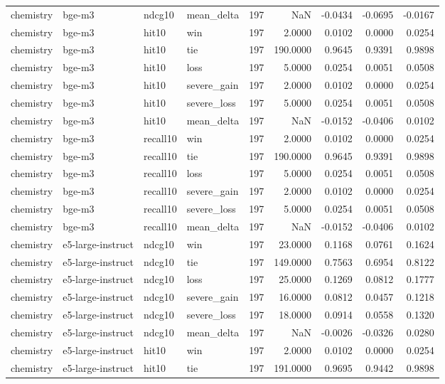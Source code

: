 \begin{tabular}{llllrrrrr}
chemistry & bge-m3 & ndcg10 & mean\_delta & 197 & NaN & -0.0434 & -0.0695 & -0.0167 \\
chemistry & bge-m3 & hit10 & win & 197 & 2.0000 & 0.0102 & 0.0000 & 0.0254 \\
chemistry & bge-m3 & hit10 & tie & 197 & 190.0000 & 0.9645 & 0.9391 & 0.9898 \\
chemistry & bge-m3 & hit10 & loss & 197 & 5.0000 & 0.0254 & 0.0051 & 0.0508 \\
chemistry & bge-m3 & hit10 & severe\_gain & 197 & 2.0000 & 0.0102 & 0.0000 & 0.0254 \\
chemistry & bge-m3 & hit10 & severe\_loss & 197 & 5.0000 & 0.0254 & 0.0051 & 0.0508 \\
chemistry & bge-m3 & hit10 & mean\_delta & 197 & NaN & -0.0152 & -0.0406 & 0.0102 \\
chemistry & bge-m3 & recall10 & win & 197 & 2.0000 & 0.0102 & 0.0000 & 0.0254 \\
chemistry & bge-m3 & recall10 & tie & 197 & 190.0000 & 0.9645 & 0.9391 & 0.9898 \\
chemistry & bge-m3 & recall10 & loss & 197 & 5.0000 & 0.0254 & 0.0051 & 0.0508 \\
chemistry & bge-m3 & recall10 & severe\_gain & 197 & 2.0000 & 0.0102 & 0.0000 & 0.0254 \\
chemistry & bge-m3 & recall10 & severe\_loss & 197 & 5.0000 & 0.0254 & 0.0051 & 0.0508 \\
chemistry & bge-m3 & recall10 & mean\_delta & 197 & NaN & -0.0152 & -0.0406 & 0.0102 \\
chemistry & e5-large-instruct & ndcg10 & win & 197 & 23.0000 & 0.1168 & 0.0761 & 0.1624 \\
chemistry & e5-large-instruct & ndcg10 & tie & 197 & 149.0000 & 0.7563 & 0.6954 & 0.8122 \\
chemistry & e5-large-instruct & ndcg10 & loss & 197 & 25.0000 & 0.1269 & 0.0812 & 0.1777 \\
chemistry & e5-large-instruct & ndcg10 & severe\_gain & 197 & 16.0000 & 0.0812 & 0.0457 & 0.1218 \\
chemistry & e5-large-instruct & ndcg10 & severe\_loss & 197 & 18.0000 & 0.0914 & 0.0558 & 0.1320 \\
chemistry & e5-large-instruct & ndcg10 & mean\_delta & 197 & NaN & -0.0026 & -0.0326 & 0.0280 \\
chemistry & e5-large-instruct & hit10 & win & 197 & 2.0000 & 0.0102 & 0.0000 & 0.0254 \\
chemistry & e5-large-instruct & hit10 & tie & 197 & 191.0000 & 0.9695 & 0.9442 & 0.9898 \\

\end{tabular}
